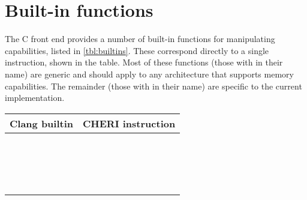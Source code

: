 \section{Built-in functions}

The C front end provides a number of built-in functions for manipulating capabilities, listed in \autoref{tbl:builtins}.
These correspond directly to a single instruction, shown in the table.
Most of these functions (those with  in their name) are generic and should apply to any architecture that supports memory capabilities.
The remainder (those with  in their name) are specific to the current implementation.

\begin{table}
	\begin{center}
		\begin{tabu}{ll}
			\toprule
			\headerrow
			Clang builtin & CHERI instruction\\
			\midrule
			 &  \\
			 &  \\
			 &  \\
			 &  \\
			 &  \\
			 &  \\
			 &  \\
			 &  \\
			 &  \\
			 &  \\
			 &  \\
			 &  \\
			 &  \\
			 &  \\
			 &  \\
			 &  \\
			 &  \\

\end{tabu}
\end{center}
\end{table}
